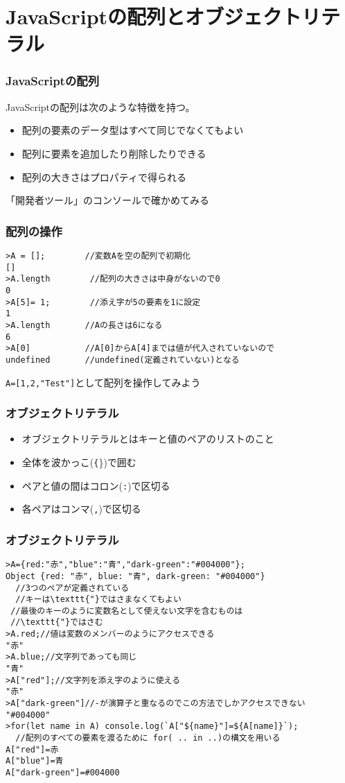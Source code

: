 

\frame{\maketitle}
 \section{JavaScriptの配列とオブジェクトリテラル}
\begin{frame}[containsverbatim]
  \frametitle{JavaScriptの配列}
  JavaScriptの配列は次のような特徴を持つ。
  \begin{itemize}
   \item 配列の要素のデータ型はすべて同じでなくてもよい
   \item 配列に要素を追加したり削除したりできる
   \item 配列の大きさはプロパティで得られる
  \end{itemize}
「開発者ツール」のコンソールで確かめてみる
 \end{frame}
 \begin{frame}[containsverbatim]
  \frametitle{配列の操作}
\begin{Verbatim}
>A = [];        //変数Aを空の配列で初期化
[]
>A.length        //配列の大きさは中身がないので0
0
>A[5]= 1;        //添え字が5の要素を1に設定
1
>A.length       //Aの長さは6になる
6
>A[0]           //A[0]からA[4]までは値が代入されていないので
undefined       //undefined(定義されていない)となる
\end{Verbatim}
  \Verb+A=[1,2,"Test"]+として配列を操作してみよう
 \end{frame}
 \begin{frame}[containsverbatim]
  \frametitle{オブジェクトリテラル}
  \begin{itemize}
   \item   オブジェクトリテラルとはキーと値のペアのリストのこと
   \item 全体を波かっこ(\texttt\{\})で囲む
   \item ペアと値の間はコロン(\texttt{:})で区切る
   \item 各ペアはコンマ(\texttt{,})で区切る
  \end{itemize}
 \end{frame}
 \begin{frame}[containsverbatim]
  \frametitle{オブジェクトリテラル}
  \small
\begin{Verbatim}
>A={red:"赤","blue":"青","dark-green":"#004000"};
Object {red: "赤", blue: "青", dark-green: "#004000"}
  //3つのペアが定義されている
  //キーは\texttt{"}ではさまなくてもよい
 //最後のキーのように変数名として使えない文字を含むものは
 //\texttt{"}ではさむ
>A.red;//値は変数のメンバーのようにアクセスできる
"赤"
>A.blue;//文字列であっても同じ
"青"
>A["red"];//文字列を添え字のように使える
"赤"
>A["dark-green"]//-が演算子と重なるのでこの方法でしかアクセスできない
"#004000"
>for(let name in A) console.log(`A["${name}"]=${A[name]}`);
  //配列のすべての要素を渡るために for( .. in ..)の構文を用いる
A["red"]=赤
A["blue"]=青
A["dark-green"]=#004000
\end{Verbatim}
 \end{frame}
